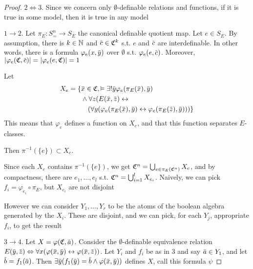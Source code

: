 \documentclass[11pt]{article}
\begin{document}
\begin{proof}
\(2\Leftrightarrow 3\). Since we concern only \(\emptyset\)-definable relations and functions, if it is true in some
model, then it is true in any model

\(1\to 2\). Let \(\pi_E:S_=^n\to S_E\) the canonical definable quotient map. Let \(e\in S_E\). By
assumption, there is \(k\in\mathbb{N}\) and \(\barc\in\fC^k\) s.t. \(e\) and \(\barc\) are interdefinable. In
other words, there is a formula \(\varphi_e(x,\bary)\) over \(\emptyset\) s.t. \(\varphi_e(e,\barc)\).
Moreover, \(\abs{\varphi_e(\fC,\barc)}=\abs{\varphi_e(e,\fC)}=1\)

Let
\begin{align*}
X_e=\{&\barx\in\fC,\vDash\exists!\bary\varphi_e(\pi_E(\barx),\bary)\\&\wedge\forall z(E(\barx,\barz)\leftrightarrow\\&\quad(\forall y(\varphi_e(\pi_E(\barx),\bary)\leftrightarrow\varphi_e(\pi_E(\barz),\bary)))\}
\end{align*}
This means that \(\varphi_e\) defines a function on \(X_e\), and that this function
separates \(E\)-classes.

Then \(\pi^{-1}(\{e\})\subset X_e\).

Since each \(X_e\) contains \(\pi^{-1}(\{e\})\), we get \(\mathfrak{C}^n=\bigcup_{e\in\pi_E(\mathfrak{C}^n)}X_e\), and by compactness,
there are \(e_1,\dots,e_l\) s.t. \(\mathfrak{C}^n=\bigcup_{i=1}^lX_{e_i}\).
Naively, we can pick \(f_i=\varphi_{e_i}\circ\pi_E\), but \(X_{e_i}\) are not disjoint

However we can consider \(Y_1,\dots,Y_r\) to be the atoms of the boolean algebra generated by the \(X_i\).
These are disjoint, and we can pick, for each \(Y_j\), appropriate \(f_i\), to get the result

\(3\to 4\). Let \(X=\varphi(\fC,\bara)\). Consider the \(\emptyset\)-definable equivalence
relation \(E(\bary,\barz)\Leftrightarrow\forall x(\varphi(\barx,\bary)\leftrightarrow\varphi(\barx,\barz))\). Let \(Y_i\) and \(f_i\) be as in 3
and say \(\bara\in Y_1\), and let \(\barb=f_1(\bara)\).
Then \(\exists\bary(f_1(\bary)=\barb\wedge\varphi(\barx,\bary))\) defines \(X\), call this formula \(\psi\)


\end{proof}
\end{document}

